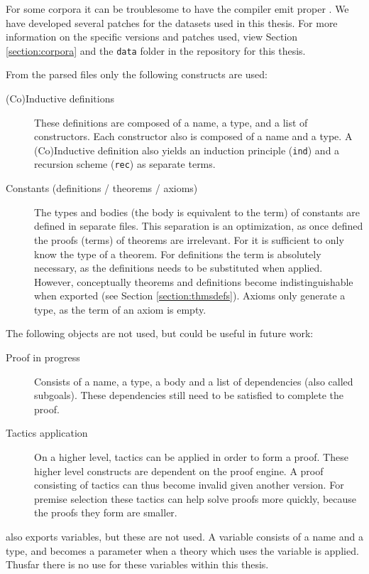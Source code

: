 For some corpora it can be troublesome to have the compiler emit proper \xml.
We have developed several patches for the datasets used in this thesis.
For more information on the specific versions and patches used,
view Section \ref{section:corpora} and the \texttt{data} folder in the repository for this thesis.

From the parsed \xml files only the following \acic constructs are used:
\begin{description}
    \item[(Co)Inductive definitions]
        These definitions are composed of a name, a type, and a list of constructors.
        Each constructor also is composed of a name and a type.
		A (Co)Inductive definition also yields an induction principle (\texttt{ind}) and a recursion scheme (\texttt{rec}) as separate terms.
    \item[Constants (definitions / theorems / axioms)]
		The types and bodies (the body is equivalent to the \acic term) of constants are defined in separate \xml files.
		This separation is an optimization, as once defined the proofs (terms) of theorems are irrelevant.
		For \coq it is sufficient to only know the type of a theorem.
		For definitions the term is absolutely necessary, as the definitions needs to be substituted when applied.
		However, conceptually theorems and definitions become indistinguishable when exported (see Section \ref{section:thmsdefs}).
        Axioms only generate a type, as the term of an axiom is empty.
\end{description}

The following objects are not used, but could be useful in future work:
\begin{description}
    \item[Proof in progress]
		Consists of a name, a type, a body and a list of dependencies (also called subgoals).
        These dependencies still need to be satisfied to complete the proof.
    \item[Tactics application]
        On a higher level, tactics can be applied in order to form a proof.
        These higher level constructs are dependent on the proof engine.
        A proof consisting of tactics can thus become invalid given another \coq version.
        For premise selection these tactics can help solve proofs more quickly, because the proofs they form are smaller.
\end{description}

\coq also exports variables, but these are not used.
A variable consists of a name and a type, and becomes a parameter when a theory which uses the variable is applied.
Thusfar there is no use for these variables within this thesis.

